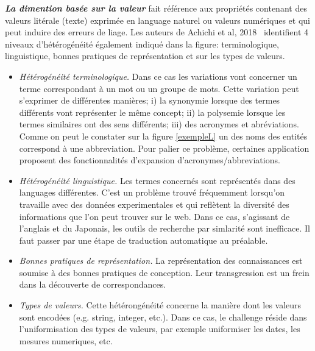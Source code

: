\textbf{\textit{La dimention basée sur la valeur}} fait référence aux propriétés contenant des valeurs litérale (texte) exprimée en language naturel ou valeurs numériques et qui peut induire des erreurs de liage. Les auteurs de  Achichi et al, 2018~\cite{achichi2018} identifient 4 niveaux d'hétérogénéité également indiqué dans la figure: terminologique, linguistique, bonnes pratiques de représentation et sur les types de valeurs.\\

\begin{itemize}
\item \textit{Hétérogénéité terminologique.} Dans ce cas les variations vont concerner un terme correspondant à un mot ou un groupe de mots. Cette variation peut s'exprimer de différentes manières; i) la synonymie lorsque des termes différents vont représenter le même concept; ii) la polysemie lorsque les termes similaires ont des sens différents; iii) des acronymes et abréviations. Comme on peut le constater sur la figure \ref{exempleL} un des noms des entités correspond à une abbreviation. Pour palier ce problème, certaines application proposent des fonctionnalités d'expansion d'acronymes/abbreviations.\\
\item \textit{Hétérogénéité linguistique.}  Les termes concernés sont représentés dans des languages différentes. C'est un problème trouvé fréquemment lorsqu'on travaille avec des données experimentales et qui reflètent la diversité des informations que l'on peut trouver sur le web. Dans ce cas, s'agissant de l'anglais et du Japonais, les outils de recherche par simlarité sont inefficace. Il faut passer par une étape de traduction automatique au préalable. \\
\item \textit{Bonnes pratiques de représentation.} La représentation des connaissances est soumise à des bonnes pratiques de conception. Leur transgression est un frein dans la découverte de correspondances.\\
\item \textit{Types de valeurs.} Cette hétérongénéité concerne la manière dont les valeurs sont encodées (e.g. string, integer, etc.). Dans ce cas, le challenge réside dans l'uniformisation des types de valeurs, par exemple uniformiser les dates, les mesures numeriques, etc.\\
\end{itemize}


